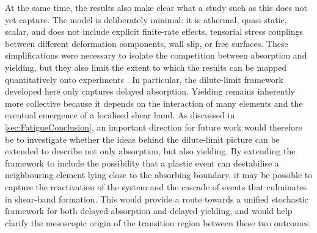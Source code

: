
At the same time, the results also make clear what a study such as this does not yet capture. The model is deliberately minimal: it is athermal, quasi-static, scalar, and does not include explicit finite-rate effects, tensorial stress couplings between different deformation components, wall slip, or free surfaces. These simplifications were necessary to isolate the competition between absorption and yielding, but they also limit the extent to which the results can be mapped quantitatively onto experiments \cite{pineChaosThresholdIrreversibility2005,Cort2008,tapadiaBandingEntangledPolymer2006,Koumakis2011,Petekidis2004,knowltonMicroscopicViewYielding2014}. In particular, the dilute-limit framework developed here only captures delayed absorption. Yielding remains inherently more collective because it depends on the interaction of many elements and the eventual emergence of a localised shear band. As discussed in \cref{sec:FatigueConclusion}, an important direction for future work would therefore be to investigate whether the ideas behind the dilute-limit picture can be extended to describe not only absorption, but also yielding. By extending the framework to include the possibility that a plastic event can destabilise a neighbouring element lying close to the absorbing boundary, it may be possible to capture the reactivation of the system and the cascade of events that culminates in shear-band formation. This would provide a route towards a unified stochastic framework for both delayed absorption and delayed yielding, and would help clarify the mesoscopic origin of the transition region between these two outcomes.

